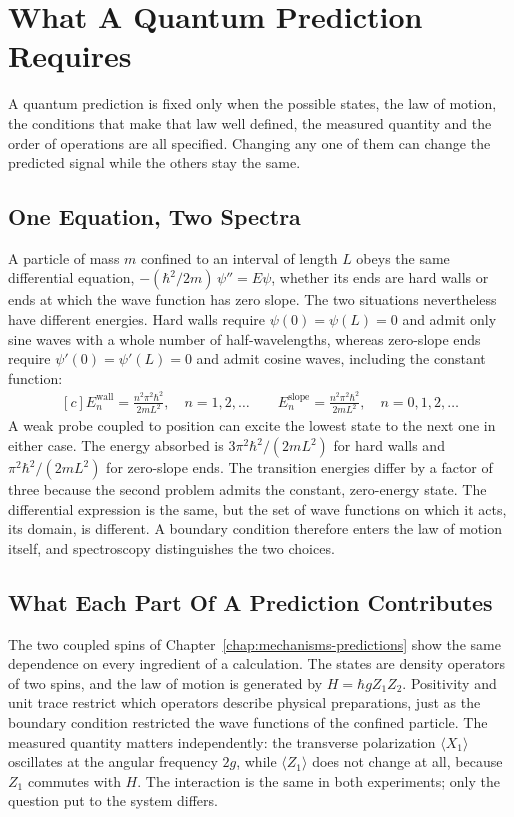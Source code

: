 \documentclass[11pt,oneside]{book}
\newenvironment{centeredalign}{\[\begin{gathered}[c]}{\end{gathered}\]}
\begin{document}
\chapter{What A Quantum Prediction Requires}\label{chap:physical-identity}
\begin{claimbox}
A quantum prediction is fixed only when the possible states, the law of motion, the conditions that make that law
well defined, the measured quantity and the order of operations are all specified. Changing any one of them can change
the predicted signal while the others stay the same.
\end{claimbox}

\section{One Equation, Two Spectra}
A particle of mass \(m\) confined to an interval of length \(L\) obeys the same differential equation,
\(-(\hbar^2/2m)\,\psi''=E\psi\), whether its ends are hard walls or ends at which the wave function has zero slope.
The two situations nevertheless have different energies. Hard walls require \(\psi(0)=\psi(L)=0\) and admit only sine
waves with a whole number of half-wavelengths, whereas zero-slope ends require \(\psi'(0)=\psi'(L)=0\) and admit cosine
waves, including the constant function:
\begin{centeredalign}
E_n^{\mathrm{wall}}=\frac{n^2\pi^2\hbar^2}{2mL^2},\quad n=1,2,\ldots\qquad
E_n^{\mathrm{slope}}=\frac{n^2\pi^2\hbar^2}{2mL^2},\quad n=0,1,2,\ldots
\end{centeredalign}
A weak probe coupled to position can excite the lowest state to the next
one in either case. The energy absorbed is
\(3\pi^2\hbar^2/(2mL^2)\) for hard walls and
\(\pi^2\hbar^2/(2mL^2)\) for zero-slope ends. The transition energies
differ by a factor of three because the second problem admits the
constant, zero-energy state. The differential expression is the same,
but the set of wave functions on which it acts, its domain, is different.
A boundary condition therefore enters the law of motion itself, and
spectroscopy distinguishes the two choices.

\section{What Each Part Of A Prediction Contributes}
The two coupled spins of Chapter~\ref{chap:mechanisms-predictions} show the same dependence on every ingredient of a
calculation. The states are density operators of two spins, and the law of motion is generated by \(H=\hbar gZ_1Z_2\).
Positivity and unit trace restrict which operators describe physical preparations, just as the boundary condition
restricted the wave functions of the confined particle. The measured quantity matters independently: the transverse
polarization \(\langle X_1\rangle\) oscillates at the angular frequency \(2g\), while \(\langle Z_1\rangle\) does not
change at all, because \(Z_1\) commutes with \(H\). The interaction is the same in both experiments; only the question
put to the system differs.
\end{document}
